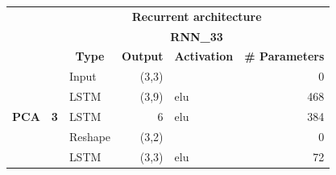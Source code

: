 \begin{table}[H]
\centering
\begin{center}
\begin{tabular}{ll|l|r|l|r|}
\cline{3-6}
                                                    &                             & \multicolumn{4}{c|}{\textbf{Recurrent architecture}}                                                                                                           \\ \cline{3-6} 
                                                    &                             & \multicolumn{4}{c|}{\textbf{RNN\_33}}                                                                                                                                  \\ \cline{3-6} 
                                                    &                             & \multicolumn{1}{c|}{\textbf{Type}} & \multicolumn{1}{c|}{\textbf{Output}} & \multicolumn{1}{c|}{\textbf{Activation}} & \multicolumn{1}{l|}{\textbf{\# Parameters}} \\ \hline
\multicolumn{1}{|l|}{\multirow{7}{*}{\textbf{PCA}}} & \multirow{7}{*}{\textbf{3}} & Input                              & (3,3)                                &                                          & 0                                           \\ \cline{3-6} 
\multicolumn{1}{|l|}{}                             &                             & LSTM                               & (3,9)                                & elu                                     & 468                                         \\ \cline{3-6} 
\multicolumn{1}{|l|}{}                              &                             & LSTM                               & 6                                    & elu                                     & 384                                         \\ \cline{3-6} 
\multicolumn{1}{|l|}{}                              &                             & Reshape                            & (3,2)                                &                                          & 0                                           \\ \cline{3-6} 
\multicolumn{1}{|l|}{}                              &                             & LSTM                               & (3,3)                                & elu                                     & 72                                          \\ \cline{3-6} 

\end{tabular}
\end{center}
\end{table}
